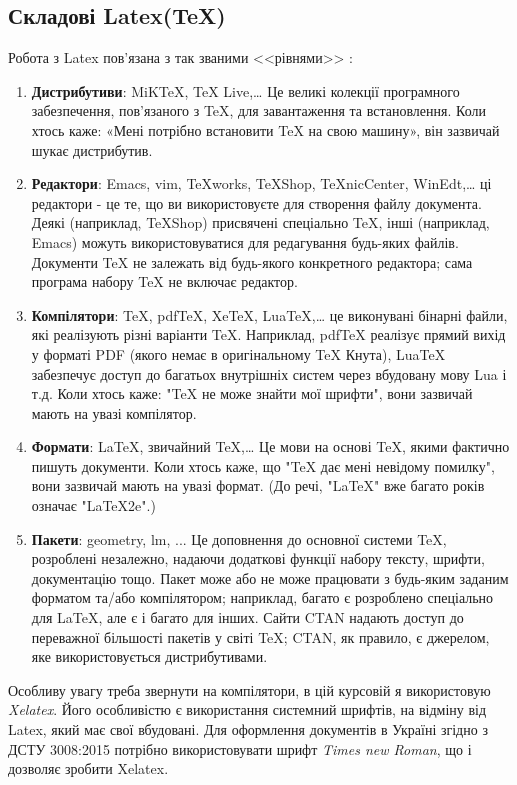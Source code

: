 \subsection{Складові Latex(TeX)}

Робота з Latex пов'язана з так званими <<рівнями>> \cite{levels}:
\begin{enumerate}[label={\arabic*.},leftmargin=1.45cm]
	\item \textbf{Дистрибутиви}: MiKTeX, TeX Live,… Це великі колекції програмного забезпечення, пов'язаного з TeX, для завантаження та встановлення. Коли хтось каже: «Мені потрібно встановити TeX на свою машину», він зазвичай шукає дистрибутив.
	\item \textbf{Редактори}: Emacs, vim, TeXworks, TeXShop, TeXnicCenter, WinEdt,… ці редактори - це те, що ви використовуєте для створення файлу документа. Деякі (наприклад, TeXShop) присвячені спеціально TeX, інші (наприклад, Emacs) можуть використовуватися для редагування будь-яких файлів. Документи TeX не залежать від будь-якого конкретного редактора; сама програма набору TeX не включає редактор.
	\item \textbf{Компілятори}: TeX, pdfTeX, XeTeX, LuaTeX,… це виконувані бінарні файли, які реалізують різні варіанти TeX. Наприклад, pdfTeX реалізує прямий вихід у форматі PDF (якого немає в оригінальному TeX Кнута), LuaTeX забезпечує доступ до багатьох внутрішніх систем через вбудовану мову Lua і т.д. Коли хтось каже: "TeX не може знайти мої шрифти", вони зазвичай мають на увазі компілятор.
	\item \textbf{Формати}: LaTeX, звичайний TeX,… Це мови на основі TeX, якими фактично пишуть документи. Коли хтось каже, що "TeX дає мені невідому помилку", вони зазвичай мають на увазі формат. (До речі, "LaTeX" вже багато років означає "LaTeX2e".)
	\item \textbf{Пакети}: geometry, lm, ... Це доповнення до основної системи TeX, розроблені незалежно, надаючи додаткові функції набору тексту, шрифти, документацію тощо. Пакет може або не може працювати з будь-яким заданим форматом та/або компілятором; наприклад, багато є розроблено спеціально для LaTeX, але є і багато для інших. Сайти CTAN надають доступ до переважної більшості пакетів у світі TeX; CTAN, як правило, є джерелом, яке використовується дистрибутивами.
\end{enumerate}	

	Особливу увагу треба звернути на компілятори, в цій курсовій я використовую \textit{Xelatex}. Його особливістю є використання системний шрифтів, на відміну від Latex, який має свої вбудовані. Для оформлення документів в Україні згідно з ДСТУ 3008:2015 потрібно використовувати шрифт \textit{Times new Roman}, що і дозволяє зробити Xelatex. 
	
